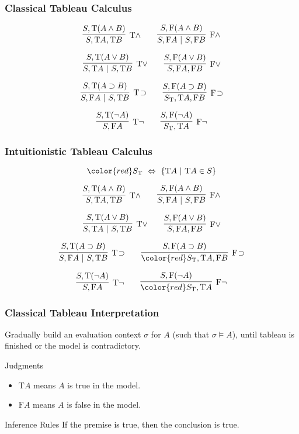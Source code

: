 \documentclass[mathserif]{beamer}
\def\|{~|~}
\def\T{\textrm{T}}
\def\F{\textrm{F}}
\def\imp{\supset}
\def\dfn{~\Leftrightarrow~}
\newcommand{\diff}[1]{{\color{red} #1}}
\newcommand{\sat}[1]{\sigma \vDash #1}
\begin{document}
\begin{frame}
\frametitle{Classical Tableau Calculus}

$$
\infer
  [\T \land]
  {S , \T A , \T B}
{
  {S , \T(A \land B)}
}
\qquad
\infer
  [\F \land]
  {S, \F A \| S, \F B}
{
  {S, \F(A \land B)}
}
$$

$$
\infer
  [\T \lor]
  {S , \T A \| S , \T B}
{
  {S , \T(A \lor B)}
}
\qquad
\infer
  [\F \lor]
  {S, \F A , \F B}
{
  {S, \F(A \lor B)}
}
$$

$$
\infer
  [\T \! \imp]
  {S , \F A \| S , \T B}
{
  {S , \T(A \imp B)}
}
\qquad
\infer
  [\F \! \imp]
  {S_{\T}, \T A , \F B}
{
  {S, \F(A \imp B)}
}
$$

$$
\infer
  [\T \neg]
  {S , \F A}
{
  {S , \T(\neg A)}
}
\qquad
\infer
  [\F \neg]
  {S_{\T}, \T A}
{
  {S, \F(\neg A)}
}
$$

\end{frame}


\begin{frame}[label=calculus]
\frametitle{Intuitionistic Tableau Calculus}

$$
\diff{S_{\T} \dfn \{ \T A \| \T A \in S \}}
$$

$$
\infer
  [\T \land]
  {S , \T A , \T B}
{
  {S , \T(A \land B)}
}
\qquad
\infer
  [\F \land]
  {S, \F A \| S, \F B}
{
  {S, \F(A \land B)}
}
$$

$$
\infer
  [\T \lor]
  {S , \T A \| S , \T B}
{
  {S , \T(A \lor B)}
}
\qquad
\infer
  [\F \lor]
  {S, \F A , \F B}
{
  {S, \F(A \lor B)}
}
$$

$$
\infer
  [\T \! \imp]
  {S , \F A \| S , \T B}
{
  {S , \T(A \imp B)}
}
\qquad
\infer
  [\F \! \imp]
  {\diff{S_{\T}}, \T A , \F B}
{
  {S, \F(A \imp B)}
}
$$

$$
\infer
  [\T \neg]
  {S , \F A}
{
  {S , \T(\neg A)}
}
\qquad
\infer
  [\F \neg]
  {\diff{S_{\T}}, \T A}
{
  {S, \F(\neg A)}
}
$$

\end{frame}


\begin{frame}
\frametitle{Classical Tableau Interpretation}

Gradually build an evaluation context $\sigma$ for $A$ (such that $\sat{A}$),
until tableau is finished or the model is contradictory.

\begin{block}{Judgments}
\begin{itemize}
\item $\T A$ means $A$ is true in the model.
\item $\F A$ means $A$ is false in the model.
\end{itemize}
\end{block}

\begin{block}{Inference Rules}
If the premise is true, then the conclusion is true.
\end{block}

\end{frame}
\end{document}
